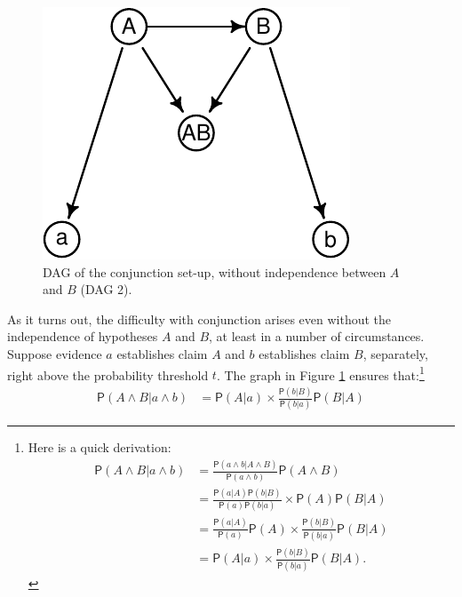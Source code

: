 \documentclass[
  10pt,
  dvipsnames,enabledeprecatedfontcommands]{scrartcl}
\newcommand{\pr}[1]{\ensuremath{\mathsf{P}(#1)}}
\begin{document}
\begin{figure}[h]

\begin{center}\includegraphics[width=0.6\linewidth]{conjunction-paradox4_files/figure-latex/fig:conjunctionDAG2-1} \end{center}
\caption{\textsf{DAG} of the conjunction set-up, without independence between $A$ and $B$ (\textsf{DAG 2}).}
\label{fig:conjunctionDAG2chapter}
\end{figure}

As it turns out, the difficulty with conjunction arises even without the
independence of hypotheses \(A\) and \(B\), at least in a number of
circumstances. Suppose evidence \(a\) establishes claim \(A\) and \(b\)
establishes claim \(B\), separately, right above the probability
threshold \(t\). The graph in Figure \ref{fig:conjunctionDAG2chapter}
ensures that:\footnote{ Here is a quick derivation: \begin{align*}
  \pr{A \wedge  B \vert a \wedge b}& =\frac{\pr{a \wedge b\vert A \wedge B}}{\pr{a\wedge b}} \pr{A \wedge B}\\
   & = \frac{\pr{a \vert A} \pr{b \vert B}}{\pr{a} \pr{b\vert a}} \times \pr{A} \pr{B \vert A}\\
     & = \frac{\pr{a \vert A}}{\pr{a}}\pr{A} \times \frac{\pr{b \vert B}}{\pr{b\vert a}} \pr{B \vert A}\\
    & = \pr{A \vert a} \times  \frac{\pr{b \vert B}}{\pr{b\vert a}} \pr{B \vert A}.
   \end{align*}} \begin{align*}
\pr{A \wedge  B \vert a \wedge b}& = \pr{A \vert a} \times  \frac{\pr{b \vert B}}{\pr{b\vert a}} \pr{B \vert A}
 \end{align*}
\end{document}
